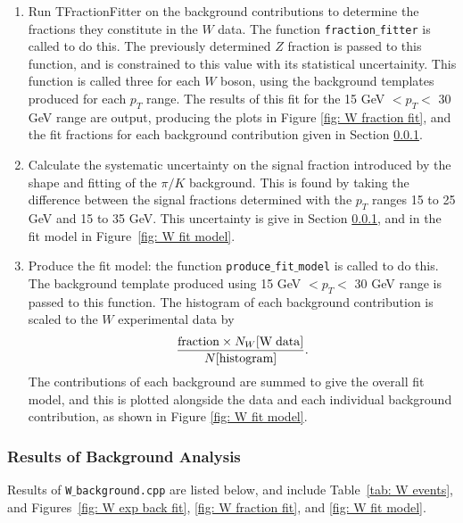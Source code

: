 \documentclass[a4paper]{article}
\begin{document}
\begin{enumerate}
    \item Run TFractionFitter on the background contributions to determine the fractions they constitute in the $W$ data. The function \texttt{fraction$\_$fitter} is called to do this. The previously determined $Z$ fraction is passed to this function, and is constrained to this value with its statistical uncertainity. This function is called three for each $W$ boson, using the background templates produced for each $p_T$ range.\newline
    The results of this fit for the 15 GeV $< p_T <$ 30 GeV range are output, producing the plots in Figure \ref{fig: W fraction fit}, and the fit fractions for each background contribution given in Section \ref{sec: W background results}.
    
    \item Calculate the systematic uncertainty on the signal fraction introduced by the shape and fitting of the $\pi/K$ background. This is found by taking the difference between the signal fractions determined with the $p_T$ ranges 15 to 25 GeV and 15 to 35 GeV. This uncertainty is give in Section \ref{sec: W background results}, and in the fit model in Figure~\ref{fig: W fit model}.

    \item Produce the fit model: the function \texttt{produce$\_$fit$\_$model} is called to do this. The background template produced using 15 GeV $< p_T <$ 30 GeV range is passed to this function. The histogram of each background contribution is scaled to the $W$ experimental data by
    \begin{equation}
        \frac{{\rm fraction} \times N_W[{\rm W \; data}]}{N[{\rm histogram}]}.
    \end{equation}
    The contributions of each background are summed to give the overall fit model, and this is plotted alongside the data and each individual background contribution, as shown in Figure \ref{fig: W fit model}.
\end{enumerate}




\subsubsection{Results of Background Analysis} \label{sec: W background results}
Results of \texttt{W$\_$background.cpp} are listed below, and include Table~\ref{tab: W events}, and Figures~\ref{fig: W exp back fit}, \ref{fig: W fraction fit}, and \ref{fig: W fit model}.
\end{document}
